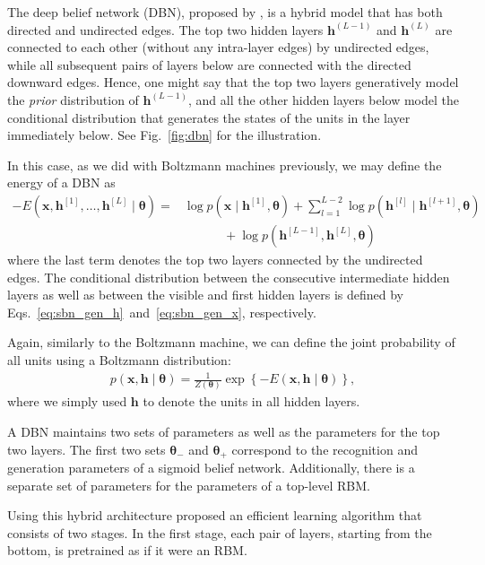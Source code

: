 \documentclass{now}
\newcommand{\qlay}[1]{\left[#1\right]}
\newcommand{\vect}[1]{\mathbf{#1}}
\newcommand{\vects}[1]{\boldsymbol{#1}}
\newcommand{\vh}[0]{\vect{h}}
\newcommand{\vx}[0]{\vect{x}}
\newcommand{\TT}[0]{{\vects{\theta}}}
\begin{document}
The deep belief network (DBN), proposed by \citet{Hinton2006nc}, is a hybrid
model that has both directed and undirected edges.  The top two hidden layers
$\vh^{(L-1)}$ and $\vh^{(L)}$ are connected to each other (without any
intra-layer edges) by undirected edges, while all subsequent pairs of layers
below are connected with the directed downward edges. Hence, one might say that
the top two layers generatively model the \textit{prior} distribution of
$\vh^{(L-1)}$, and all the other hidden layers below model the conditional
distribution that generates the states of the units in the layer immediately
below. See Fig.~\ref{fig:dbn} for the illustration.

In this case, as we did with Boltzmann machines previously, we may define the
energy of a DBN as
\begin{align}
    \label{eq:dbn_energy}
    -E(\vx, \vh^{\qlay{1}}, \dots, \vh^{\qlay{L}} \mid \TT)
    = 
    &\log p(\vx \mid \vh^{\qlay{1}}, \TT) + \sum_{l=1}^{L-2} \log
    p(\vh^{\qlay{l}} \mid \vh^{\qlay{l+1}}, \TT) 
    \nonumber \\
    &\phantom{= \log}+\log p(\vh^{\qlay{L-1}}, \vh^{\qlay{L}}, \TT) 
\end{align}
where the last term denotes the top two layers connected by the undirected
edges. The conditional distribution between the consecutive intermediate hidden
layers as well as between the visible and first hidden layers is defined by
Eqs.~\eqref{eq:sbn_gen_h}~and~\eqref{eq:sbn_gen_x}, respectively.

Again, similarly to the Boltzmann machine, we can define the joint probability
of all units using a Boltzmann distribution:
\begin{align*}
    p(\vx, \vh \mid \TT) = \frac{1}{Z(\TT)} \exp \left\{
    -E(\vx, \vh \mid \TT)
    \right\},
\end{align*}
where we simply used $\vh$ to denote the units in all hidden layers.

A DBN maintains two sets of parameters as well as the parameters for the top two
layers.  The first two sets $\TT_-$ and $\TT_+$ correspond to the recognition
and generation parameters of a sigmoid belief network.  Additionally, there is a
separate set of parameters for the parameters of a top-level RBM.

Using this hybrid architecture \citet{Hinton2006nc} proposed an efficient
learning algorithm that consists of two stages.  In the first stage, each pair
of layers, starting from the bottom, is pretrained as if it were an RBM.
\end{document}
